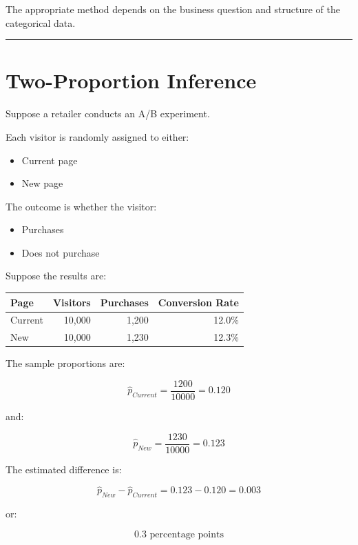 \documentclass[
  letterpaper,
  DIV=11,
  numbers=noendperiod]{scrreprt}
\newcounter{none} %
\providecommand{\tightlist}{%
  \setlength{\itemsep}{0pt}\setlength{\parskip}{0pt}}
\begin{document}
The appropriate method depends on the business question and structure of
the categorical data.

\begin{center}\rule{0.5\linewidth}{0.5pt}\end{center}


\chapter{Two-Proportion Inference}\label{two-proportion-inference}

Suppose a retailer conducts an A/B experiment.

Each visitor is randomly assigned to either:

\begin{itemize}
\tightlist
\item
  Current page
\item
  New page
\end{itemize}

The outcome is whether the visitor:

\begin{itemize}
\tightlist
\item
  Purchases
\item
  Does not purchase
\end{itemize}

Suppose the results are:

{\def\LTcaptype{none} %
\begin{longtable}[]{@{}lrrr@{}}
\toprule\noalign{}
Page & Visitors & Purchases & Conversion Rate \\
\midrule\noalign{}
\endhead
\bottomrule\noalign{}
\endlastfoot
Current & 10,000 & 1,200 & 12.0\% \\
New & 10,000 & 1,230 & 12.3\% \\
\end{longtable}
}

The sample proportions are:

\[
\hat{p}_{Current}
=
\frac{1200}{10000}
=
0.120
\]

and:

\[
\hat{p}_{New}
=
\frac{1230}{10000}
=
0.123
\]

The estimated difference is:

\[
\hat{p}_{New}-\hat{p}_{Current}
=
0.123-0.120
=
0.003
\]

or:

\[
\boxed{0.3\text{ percentage points}}
\]
\end{document}
